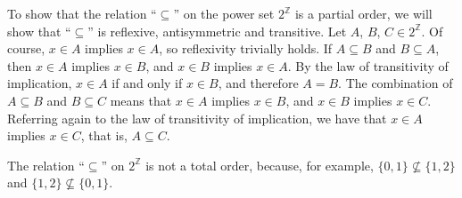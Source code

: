 To show that the relation ``$\subseteq$'' on the power set $2^\mathbb{Z}$ is a partial order, we will show that ``$\subseteq$'' is reflexive, antisymmetric and transitive.
Let $A$, $B$, $C\in2^\mathbb{Z}$.
Of course, $x\in A$ implies $x\in A$, so reflexivity trivially holds.
If $A\subseteq B$ and $B\subseteq A$, then $x\in A$ implies $x\in B$, and $x\in B$ implies $x\in A$.
By the law of transitivity of implication, $x\in A$ if and only if $x\in B$, and therefore $A=B$.
The combination of $A\subseteq B$ and $B\subseteq C$ means that $x\in A$ implies $x\in B$, and $x\in B$ implies $x\in C$.
Referring again to the law of transitivity of implication, we have that $x\in A$ implies $x\in C$, that is, $A\subseteq C$.

The relation ``$\subseteq$'' on $2^\mathbb{Z}$ is not a total order, because, for example, $\{0,1\}\nsubseteq\{1,2\}$ and $\{1,2\}\nsubseteq\{0,1\}$.
